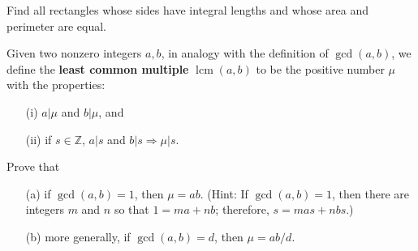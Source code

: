   \begin{exercise}[Shifrin 1.2.12]
    Find all rectangles whose sides have integral lengths and whose area and perimeter are equal.
  \end{exercise}

  \begin{exercise}[Shifrin 1.2.13]
    Given two nonzero integers $a, b$, in analogy with the definition of $\gcd(a, b)$, we define the \textbf{least common multiple} $\operatorname{lcm}(a, b)$ to be the positive number $\mu$ with the properties:
    \begin{enumerate}
      \item[(i)] $a|\mu$ and $b|\mu$, and
      \item[(ii)] if $s \in \mathbb{Z}$, $a|s$ and $b|s \Rightarrow \mu|s$.
    \end{enumerate}
    Prove that
    \begin{enumerate}
      \item[(a)] if $\gcd(a, b) = 1$, then $\mu = ab$. (Hint: If $\gcd(a, b) = 1$, then there are integers $m$ and $n$ so that $1 = ma + nb$; therefore, $s = mas + nbs$.)
      \item[(b)] more generally, if $\gcd(a, b) = d$, then $\mu = ab/d$.
    \end{enumerate}
  \end{exercise}
